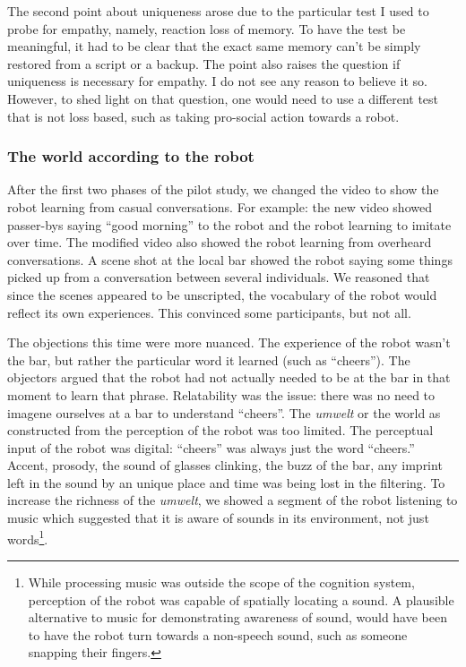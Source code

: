 The second point about uniqueness arose due to the particular test I used to probe for empathy, namely, reaction loss of memory. To have the test be meaningful, it had to be clear that the exact same memory can't be simply restored from a script or a backup. The point also raises the question if uniqueness is necessary for empathy. I do not see any reason to believe it so. However, to shed light on that question, one would need to use a different test that is not loss based, such as taking pro-social action towards a robot.


\subsubsection{The world according to the robot}

After the first two phases of the pilot study, we changed the video to show the robot learning from casual conversations. For example: the new video showed passer-bys saying ``good morning'' to the robot and the robot learning to imitate over time. The modified video also showed the robot learning from overheard conversations. A scene shot at the local bar showed the robot saying some things picked up from a conversation between several individuals. We reasoned that since the scenes appeared to be unscripted, the vocabulary of the robot would reflect its own experiences. This convinced some participants, but not all. 

The objections this time were more nuanced. The experience of the robot wasn't the bar, but rather the particular word it learned (such as ``cheers''). The objectors argued that the robot had not actually needed to be at the bar in that moment to learn that phrase. Relatability was the issue: there was no need to imagene ourselves at a bar to understand ``cheers''. The \emph{umwelt} or the world as constructed from the perception of the robot was too limited. The perceptual input of the robot was digital: ``cheers'' was always just the word ``cheers.'' Accent, prosody, the sound of glasses clinking, the buzz of the bar, any imprint left in the sound by an unique place and time was being lost in the filtering. To increase the richness of the \emph{umwelt}, we showed a segment of the robot listening to music which suggested that it is aware of sounds in its environment, not just words\footnote{While processing music was outside the scope of the cognition system, perception of the robot was capable of spatially locating a sound. A plausible alternative to music for demonstrating awareness of sound, would have been to have the robot turn towards a non-speech sound, such as someone snapping their fingers.}. 

